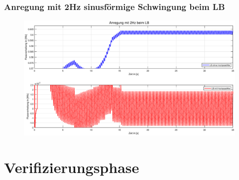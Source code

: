 \documentclass[serif,11pt, xcolor=table]{beamer}
\begin{document}
	\begin{frame}
		\frametitle{Anregung mit 2Hz sinusförmige Schwingung beim LB}
	
		\begin{figure}[htbp]
			\centering
			\includegraphics[scale=0.30]{Abbildungen/LB_2.eps}
			
		\end{figure}	
		
	\end{frame}
	\section{Verifizierungsphase}
\end{document}
